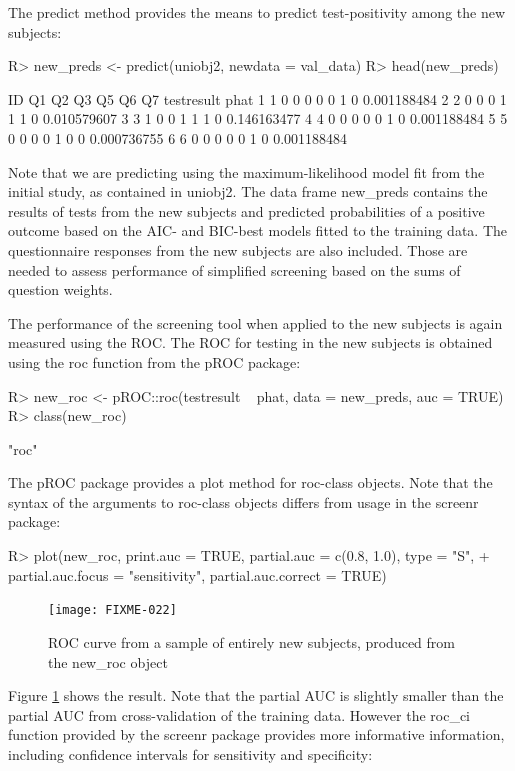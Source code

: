 \documentclass[11pt]{report}
\renewenvironment{Schunk}{\vspace{\topsep}}{\vspace{\topsep}}
\begin{document}
The \textsf{predict} method provides the means to predict test-positivity among
the new subjects:
\begin{Schunk}
\begin{Sinput}
R> new_preds <- predict(uniobj2, newdata = val_data)
R> head(new_preds)
\end{Sinput}
\begin{Soutput}
  ID Q1 Q2 Q3 Q5 Q6 Q7 testresult        phat
1  1  0  0  0  0  0  1          0 0.001188484
2  2  0  0  0  1  1  1          0 0.010579607
3  3  1  0  0  1  1  1          0 0.146163477
4  4  0  0  0  0  0  1          0 0.001188484
5  5  0  0  0  0  1  0          0 0.000736755
6  6  0  0  0  0  0  1          0 0.001188484
\end{Soutput}
\end{Schunk}
Note that we are predicting using the maximum-likelihood model fit
from the initial study, as contained in \textsf{uniobj2}. The data
frame \textsf{new\_preds} contains the results of tests from the new
subjects and predicted probabilities of a positive outcome based on
the AIC- and BIC-best models fitted to the training data. The
questionnaire responses from the new subjects are also included. Those
are needed to assess performance of simplified screening based on the
sums of question weights.

The performance of the screening tool when applied to the new subjects
is again measured using the ROC.  The ROC for testing in the new
subjects is obtained using the \textsf{roc} function from the \textsf{pROC} package:
\begin{Schunk}
\begin{Sinput}
R> new_roc <- pROC::roc(testresult ~ phat, data = new_preds, auc = TRUE)
R> class(new_roc)
\end{Sinput}
\begin{Soutput}
[1] "roc"
\end{Soutput}
\end{Schunk}

The \textsf{pROC} package provides a plot method for
\textsf{roc}-class objects. Note that the syntax of the arguments to
\textsf{roc}-class objects differs from usage in the \textsf{screenr}
package:
\begin{Schunk}
\begin{Sinput}
R> plot(new_roc, print.auc = TRUE, partial.auc =  c(0.8, 1.0), type = "S",
+      partial.auc.focus = "sensitivity", partial.auc.correct = TRUE)
\end{Sinput}
\end{Schunk}
\begin{figure}[!h]
  \begin{center}
\texttt{[image: FIXME-022]}
\caption{ROC curve from a sample of entirely new subjects, produced
  from the \textsf{new\_roc} object}
\label{fig:f3}
\end{center}
\end{figure}
Figure \ref{fig:f3} shows the result. Note that the partial AUC is slightly
smaller than the partial AUC from cross-validation of the training
data. However the \textsf{roc\_ci} function provided by the
\textsf{screenr} package provides more informative information,
including confidence intervals for sensitivity and specificity:
\end{document}
